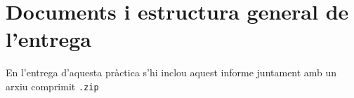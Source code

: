 \section{Documents i estructura general de l'entrega}
En l'entrega d'aquesta pràctica s'hi inclou aquest informe juntament amb un arxiu comprimit \texttt{.zip}